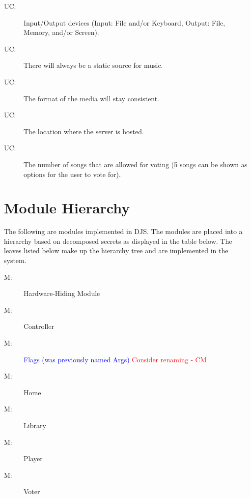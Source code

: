 \documentclass[12pt, titlepage]{article}
\newcounter{ucnum}
\newcommand{\uctheucnum}{UC\theucnum}
\newcounter{mnum}
\newcommand{\mthemnum}{M\themnum}
\begin{document}
\begin{description}
\item[ \uctheucnum \label{ucIO}:] Input/Output devices
 (Input: File and/or Keyboard, Output: File, Memory, and/or Screen).
\item[ \uctheucnum \label{ucInput}:] There will always be a static source for music.
\item[ \uctheucnum \label{ucInput}:] The format of the media will stay consistent.
\item[ \uctheucnum \label{ucInput}:] The location where the server is hosted.
\item[ \uctheucnum \label{ucInput}:] The number of songs that are allowed for voting (5 songs can be shown as options for the user to vote for).
\end{description}


\section{Module Hierarchy} \label{SecMH}
The following are modules implemented in DJS. The modules are placed into a hierarchy based on decomposed secrets as displayed in the table below. The leaves listed below make up the hierarchy tree and are implemented in the system.


\begin{description}
\item [ \mthemnum \label{mHH}:] Hardware-Hiding Module
\item [ \mthemnum \label{mSR}:] Controller
\item [ \mthemnum \label{mAS}:] \textcolor{blue}{Flags (was previously named Args)} \textcolor{red}{Consider renaming - CM}
\item [ \mthemnum \label{mDO}:] Home
\item [ \mthemnum \label{mLM}:] Library
\item [ \mthemnum \label{mPM}:] Player
\item [ \mthemnum \label{mIV}:] Voter

\end{description}
\end{document}
